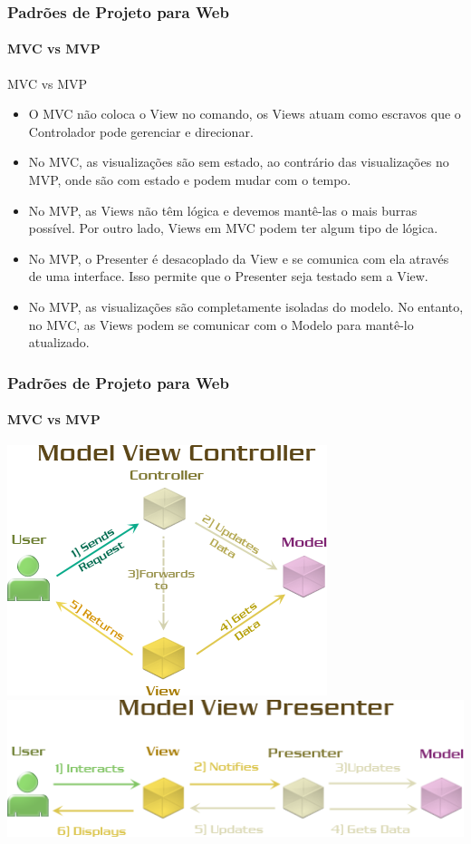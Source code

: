 \documentclass[
	9pt, %
	t, %
]{beamer}
\begin{document}
\begin{frame}
	\frametitle{Padrões de Projeto para Web}
	\framesubtitle{MVC vs MVP}

	\begin{block}{MVC vs MVP}
		\begin{itemize}
			\item O \alert{MVC} não coloca o View no comando, os Views atuam como escravos que o Controlador pode gerenciar e direcionar.
			\item No \alert{MVC}, as visualizações são sem estado, ao contrário das visualizações no MVP, onde são com estado e podem mudar com o tempo.
			\item No \alert{MVP}, as Views não têm lógica e devemos mantê-las o mais burras possível. Por outro lado, Views em MVC podem ter algum tipo de lógica.
			\item No \alert{MVP}, o Presenter é desacoplado da View e se comunica com ela através de uma interface. Isso permite que o Presenter seja testado sem a View.
			\item No \alert{MVP}, as visualizações são completamente isoladas do modelo. No entanto, no MVC, as Views podem se comunicar com o Modelo para mantê-lo atualizado.
		\end{itemize}
	\end{block}

\end{frame}

\begin{frame}
	\frametitle{Padrões de Projeto para Web}
	\framesubtitle{MVC vs MVP}

	\centering
	\includegraphics[width=0.5\linewidth]{Images/mvc2.png}
	\includegraphics[width=0.8\linewidth]{Images/mvp2.png}

\end{frame}
\end{document}
